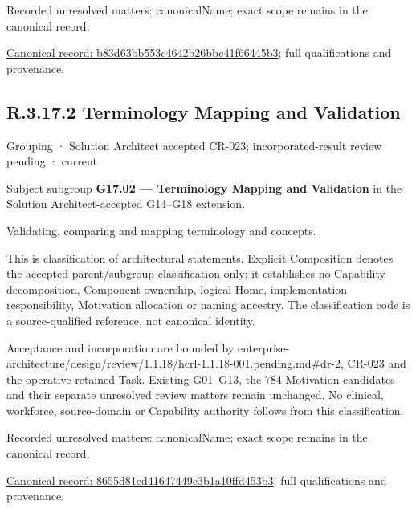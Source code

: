 {\small Recorded unresolved matters: canonicalName; exact scope remains in the canonical record.}\par
{\footnotesize \href{../../../../continuum/grouping/b83d63bb553c4642b26bbc41f66445b3.md}{Canonical record: b83d63bb553c4642b26bbc41f66445b3}; full qualifications and provenance.}\par
\subsection*{R.3.17.2 Terminology Mapping and Validation}
\label{navigation:R.3.17.2}

\label{element:8655d81cd41647449c3b1a10ffd453b3}
{\small Grouping · Solution Architect accepted CR-023; incorporated-result review pending · current}\par

Subject subgroup \textbf{G17.02 — Terminology Mapping and Validation} in the Solution Architect-accepted G14–G18 extension.



Validating, comparing and mapping terminology and concepts.



This is classification of architectural statements. Explicit Composition denotes the accepted parent/subgroup classification only; it establishes no Capability decomposition, Component ownership, logical Home, implementation responsibility, Motivation allocation or naming ancestry. The classification code is a source-qualified reference, not canonical identity.



Acceptance and incorporation are bounded by enterprise-architecture/design/review/1.1.18/hcrl-1.1.18-001.pending.md\#dr-2, CR-023 and the operative retained Task. Existing G01–G13, the 784 Motivation candidates and their separate unresolved review matters remain unchanged. No clinical, workforce, source-domain or Capability authority follows from this classification.


{\small Recorded unresolved matters: canonicalName; exact scope remains in the canonical record.}\par
{\footnotesize \href{../../../../continuum/grouping/8655d81cd41647449c3b1a10ffd453b3.md}{Canonical record: 8655d81cd41647449c3b1a10ffd453b3}; full qualifications and provenance.}\par
